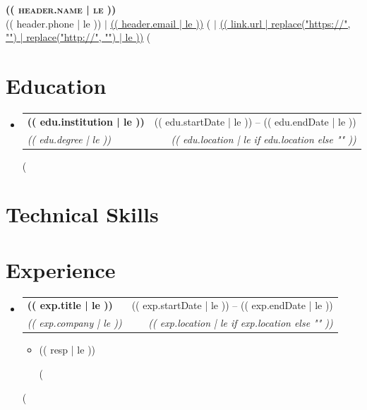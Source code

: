 \documentclass[letterpaper,11pt]{article}
\makeatletter
\newcommand{\resumeItem}[1]{
  \item\small{
    {#1 \vspace{-2pt}}
  }
}
\newcommand{\resumeSubheading}[4]{
  \vspace{-2pt}\item
    \begin{tabular*}{0.97\textwidth}[t]{l@{\extracolsep{\fill}}r}
      \textbf{#1} & {\footnotesize #2} \\
      \textit{\small#3} & \textit{\footnotesize #4} \\
    \end{tabular*}\vspace{-7pt}
}
\newcommand{\resumeSubHeadingListStart}{\begin{itemize}[leftmargin=0.15in, label={}]}
\newcommand{\resumeSubHeadingListEnd}{\end{itemize}}
\newcommand{\resumeItemListStart}{\begin{itemize}}
\newcommand{\resumeItemListEnd}{\end{itemize}\vspace{-10pt}}
\makeatother
\begin{document}
\begin{center}
    \textbf{\Huge \scshape (( header.name | le ))} \\ \vspace{1pt}
    \small (( header.phone | le )) $|$ \href{mailto:(( header.email ))}{\underline{(( header.email | le ))}}
(%
    $|$ \href{(( link.url ))}{\underline{(( link.url | replace("https://", "") | replace("http://", "") | le ))}}
(%
\end{center}

\section{Education}
  \resumeSubHeadingListStart
(%
    \resumeSubheading
      {(( edu.institution | le ))}{(( edu.startDate | le )) -- (( edu.endDate | le ))}
      {(( edu.degree | le ))}{(( edu.location | le if edu.location else "" ))}
(%
  \resumeSubHeadingListEnd

\section{Technical Skills}

\section{Experience}
  \resumeSubHeadingListStart
(%
    \resumeSubheading
      {(( exp.title | le ))}{(( exp.startDate | le )) -- (( exp.endDate | le ))}
      {(( exp.company | le ))}{(( exp.location | le if exp.location else "" ))}
      \resumeItemListStart
(%
        \resumeItem{(( resp | le ))}
(%
      \resumeItemListEnd
(%
  \resumeSubHeadingListEnd

\end{document}
